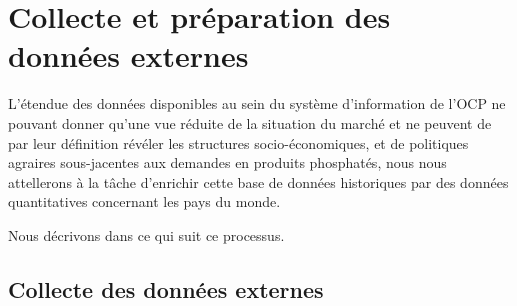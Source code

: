 				\begin{figure}[H]
				\centering
				\caption{}
				\label{fig:}
				\end{figure}

	\section{Collecte et préparation des données externes}
	L'étendue des données disponibles au sein du système d'information de l'OCP ne pouvant donner qu'une vue réduite de la situation du marché et ne peuvent de par leur définition révéler les structures socio-économiques,  et de politiques agraires sous-jacentes aux demandes en produits phosphatés, nous nous attellerons à la tâche d'enrichir cette base de données historiques par des données quantitatives concernant les pays du monde.
	\par
	Nous décrivons dans ce qui suit ce processus. 
	\subsection{Collecte des données externes}
